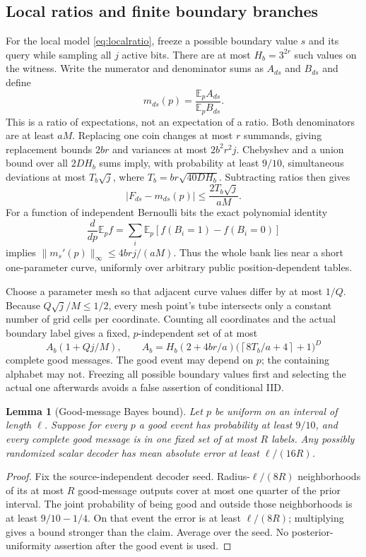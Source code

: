 \documentclass[11pt,letterpaper]{article}
\newtheorem{lemma}[theorem]{Lemma}
\theoremstyle{definition}\newtheorem{definition}[theorem]{Definition}
\theoremstyle{remark}\newtheorem{remark}[theorem]{Remark}
\newcommand{\E}{\mathbb{E}}
\newcommand{\ceil}[1]{\left\lceil #1\right\rceil}
\begin{document}
\subsection{Local ratios and finite boundary branches}
For the local model \eqref{eq:localratio}, freeze a possible boundary value $s$ and its query while sampling all $j$ active bits. There are at most $H_b=3^{2r}$ such values on the witness. Write the numerator and denominator sums as $A_{ds}$ and $B_{ds}$ and define
\[
 m_{ds}(p)=\frac{\E_p A_{ds}}{\E_p B_{ds}}.
\]
This is a ratio of expectations, not an expectation of a ratio. Both denominators are at least $aM$. Replacing one coin changes at most $r$ summands, giving replacement bounds $2br$ and variances at most $2b^2r^2j$. Chebyshev and a union bound over all $2DH_b$ sums imply, with probability at least $9/10$, simultaneous deviations at most $T_b\sqrt j$, where $T_b=br\sqrt{40DH_b}$. Subtracting ratios then gives
\begin{equation}\label{eq:localtube}
 |F_{ds}-m_{ds}(p)|\le\frac{2T_b\sqrt j}{aM}.
\end{equation}
For a function of independent Bernoulli bits the exact polynomial identity
\begin{equation}\label{eq:derivative}
 \frac{d}{dp}\E_pf=\sum_i\E_p[f(B_i=1)-f(B_i=0)]
\end{equation}
implies $\|m_s'(p)\|_\infty\le4brj/(aM)$. Thus the whole bank lies near a short one-parameter curve, uniformly over arbitrary public position-dependent tables.

Choose a parameter mesh so that adjacent curve values differ by at most $1/Q$. Because $Q\sqrt j/M\le1/2$, every mesh point's tube intersects only a constant number of grid cells per coordinate. Counting all coordinates and the actual boundary label gives a fixed, $p$-independent set of at most
\begin{equation}\label{eq:labels}
 A_b(1+Qj/M),\qquad
 A_b=H_b(2+4br/a)\bigl(\ceil{8T_b/a+4}+1\bigr)^D
\end{equation}
complete good messages. The good event may depend on $p$; the containing alphabet may not. Freezing all possible boundary values first and selecting the actual one afterwards avoids a false assertion of conditional IID.

\begin{lemma}[Good-message Bayes bound]\label{lem:messages}
Let $p$ be uniform on an interval of length $\ell$. Suppose for every $p$ a good event has probability at least $9/10$, and every complete good message is in one fixed set of at most $R$ labels. Any possibly randomized scalar decoder has mean absolute error at least $\ell/(16R)$.
\end{lemma}
\begin{proof}
Fix the source-independent decoder seed. Radius-$\ell/(8R)$ neighborhoods of its at most $R$ good-message outputs cover at most one quarter of the prior interval. The joint probability of being good and outside those neighborhoods is at least $9/10-1/4$. On that event the error is at least $\ell/(8R)$; multiplying gives a bound stronger than the claim. Average over the seed. No posterior-uniformity assertion after the good event is used.
\end{proof}
\end{document}
